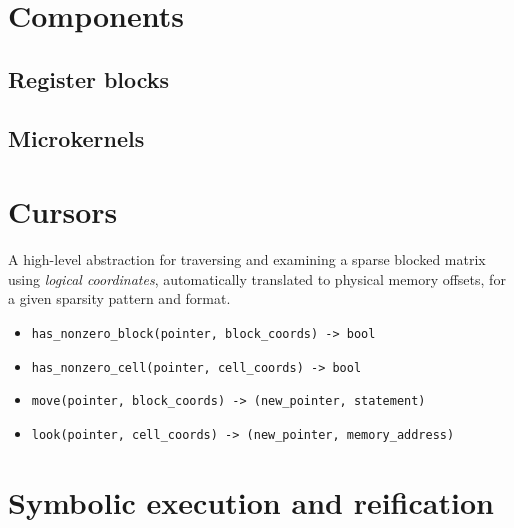\section{Components}
\subsection{Register blocks}
\subsection{Microkernels}

\section{Cursors}
    A high-level abstraction for traversing and examining a sparse blocked matrix using \emph{logical coordinates}, automatically translated to physical memory offsets, for a given sparsity pattern and format. 
    \begin{itemize}
    \item \verb|has_nonzero_block(pointer, block_coords) -> bool|
    \item \verb|has_nonzero_cell(pointer, cell_coords) -> bool|
    \item \verb|move(pointer, block_coords) -> (new_pointer, statement)|
    \item \verb|look(pointer, cell_coords) -> (new_pointer, memory_address)|
    \end{itemize}

\section{Symbolic execution and reification}

